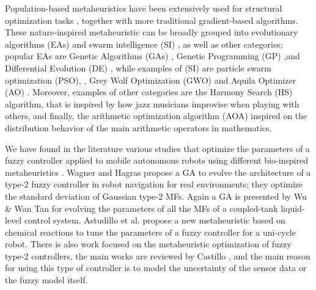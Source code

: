 \documentclass[symmetry,article,submit,moreauthors,pdftex]{Definitions/mdpi}
\begin{document}
Population-based metaheuristics have been extensively used for structural
optimization tasks \cite{perez2007particle,durgun2012structural,yildiz2012new,geem2005harmony}, 
together with more traditional gradient-based algorithms. These nature-inspired  
metaheuristic can be broadly grouped into evolutionary
algorithms (EAs) \cite{back1996evolutionary} and swarm intelligence (SI)
\cite{kennedy2006swarm}, as well as other categories; popular EAs are Genetic
Algorithms (GAs) \cite{holland1992adaptation,eiben2003genetic}, Genetic
Programming (GP) \cite{back1996evolutionary},and Differential Evolution (DE)
\cite{karabouga2004simple}, while examples of (SI) \cite{kennedy2006swarm} are
particle swarm optimization (PSO), \cite{clerc2010particle}, Grey Wolf
Optimization (GWO) \cite{mirjalili2014grey} and Aquila Optimizer (AO)
\cite{abualigah2021aquila}. Moreover, examples of other categories are the
Harmony Search (HS) \cite{geem2001new} algorithm, that is inspired by how jazz
musicians improvise when playing with others, and finally, the arithmetic
optimization algorithm (AOA) \cite{abualigah2021arithmetic} inspired on the
distribution behavior of the main arithmetic operators in mathematics.


We have found in the literature various studies that optimize the parameters of
a fuzzy controller applied to mobile autonomous robots using different
bio-inspired metaheuristics
\cite{hernandez_optimization_2019,lagunes_methodology_2017}.  Wagner and Hagras
\cite{wagner2007genetic} propose a GA to evolve the architecture of a type-2
fuzzy controller in robot navigation for real environments; they optimize the
standard deviation of Gaussian type-2 MFs.  Again a GA is presented by Wu \&
Wan Tan \cite{wu2006genetic} for evolving the parameters of all the MFs of a
coupled-tank liquid-level control system.  Astudillo et al.
\cite{astudillo2013optimization} propose a new metaheuristic based on chemical
reactions to tune the parameters of a fuzzy controller for a uni-cycle robot.
There is also work focused on the metaheuristic optimization of fuzzy type-2
controllers, the main works are reviewed by Castillo
\cite{castillo_review_2012}, and the main reason for using this type of
controller is to model the uncertainty of the sensor data or the fuzzy model
itself.
\end{document}
